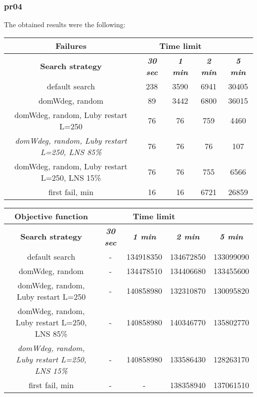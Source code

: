 \subsubsection{pr04}
The obtained results were the following:
{
\renewcommand{\arraystretch}{2}
\begin{longtable}[h]{| c | c | c | c | c |}
    \hline
    \textbf{Failures} & \multicolumn{3}{c}{Time limit} & \\
    \hline
    \textbf{Search strategy} & \textbf{\textit{30 sec}} & \textbf{\textit{1 min}} & \textbf{\textit{2 min}} & \textbf{\textit{5 min}} \\
    \hline
    \endhead
    default search                                         & 238 &  3590 &  6941 &  30405 \\
    \hline
    domWdeg, random                                        &  89 &  3442 &  6800 &  36015 \\
    \hline
    domWdeg, random, Luby restart L=250                    &  76 &    76 &   759 &   4460 \\
    \hline
    \textit{domWdeg, random, Luby restart L=250, LNS 85\%} &  76 &    76 &    76 &    107 \\
    \hline
    domWdeg, random, Luby restart L=250, LNS 15\%          &  76 &    76 &   755 &   6566 \\
    \hline
    first fail, min                                        &  16 &    16 &  6721 &  26859 \\
    \hline
\end{longtable}
}

{
\renewcommand{\arraystretch}{2}
\begin{longtable}[h]{| c | c | c | c | c |}
    \hline
    \textbf{Objective function} & \multicolumn{3}{c}{Time limit} & \\
    \hline
    \textbf{Search strategy} & \textbf{\textit{30 sec}} & \textbf{\textit{1 min}} & \textbf{\textit{2 min}} & \textbf{\textit{5 min}} \\
    \hline
    \endhead
    default search                                         &         - & 134918350 & 134672850 & 133099090 \\
    \hline
    domWdeg, random                                        &         - & 134478510 & 134406680 & 133455600 \\
    \hline
    domWdeg, random, Luby restart L=250                    &         - & 140858980 & 132310870 & 130095820 \\
    \hline
    domWdeg, random, Luby restart L=250, LNS 85\%          &         - & 140858980 & 140346770 & 135802770 \\
    \hline
    \textit{domWdeg, random, Luby restart L=250, LNS 15\%} &         - & 140858980 & 133586430 & 128263170 \\
    \hline
    first fail, min                                        &        - &         - & 138358940 & 137061510 \\
    \hline
\end{longtable}
}

